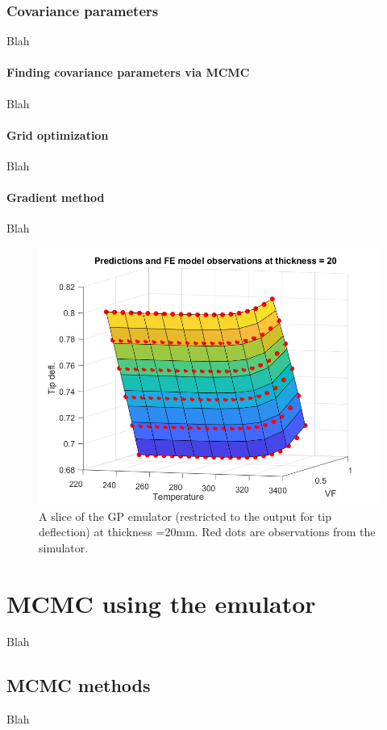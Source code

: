 \documentclass{article}
\begin{document}
\subsubsection{Covariance parameters}
Blah

\paragraph{Finding covariance parameters via MCMC}
Blah

\paragraph{Grid optimization}
Blah

\paragraph{Gradient method}
Blah

\begin{figure}
\centering
\includegraphics[width=.65\linewidth]{emulator_surface}
\caption{A slice of the GP emulator (restricted to the output for tip deflection) at thickness =20mm. Red dots are observations from the simulator.}
\label{fig:emulator_surface}
\end{figure}

\section{MCMC using the emulator}
Blah

\subsection{MCMC methods}
Blah
\end{document}
